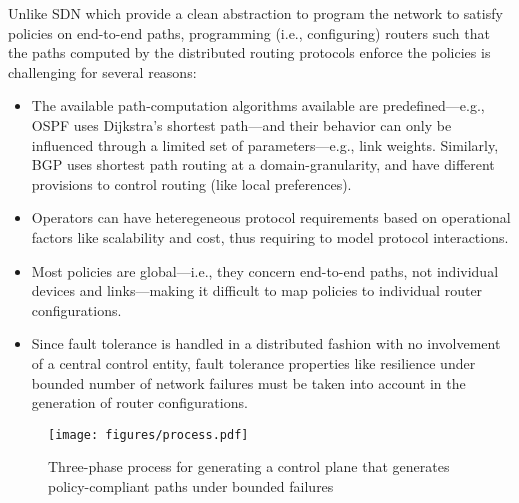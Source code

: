 Unlike SDN which provide a clean abstraction
to program the network to satisfy policies 
on end-to-end paths,
programming (i.e., configuring) 
routers such that the paths computed by
the distributed routing protocols enforce the 
policies is challenging for several reasons: 
\begin{itemize}
\item The available path-computation algorithms
available are predefined---e.g., OSPF uses
Dijkstra's shortest path---and their behavior can only be influenced
through a limited set of parameters---e.g.,
link weights. Similarly, BGP uses shortest
path routing at a domain-granularity, and have different
provisions to control routing (like local preferences).  
\item Operators can have 
heteregeneous protocol requirements based on operational
factors like scalability and cost, thus requiring to model
protocol interactions. 
\item Most policies are
global---i.e., they concern end-to-end paths, not individual devices and
links---making it difficult to map policies to
individual router configurations. 
\item Since fault tolerance is handled in a distributed 
fashion with no involvement of a central control entity,  
fault tolerance properties like resilience under bounded
number of network failures must be taken into account in
the generation of router configurations. 

\end{itemize}

\begin{figure*}
\centering
\texttt{[image: figures/process.pdf]}
\caption{Three-phase process for generating a control plane that generates
    policy-compliant paths under bounded failures}
\label{fig:process}
\end{figure*}

